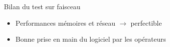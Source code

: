 \documentclass[8pt]{beamer}
\begin{document}
\begin{frame}

      \begin{block}{Bilan du test sur faisceau}
        \begin{itemize}
            \item Performances mémoires et réseau $\rightarrow$ perfectible
            \item Bonne prise en main du logiciel par les opérateurs
        \end{itemize}
      \end{block}
    \end{frame}
\end{document}
